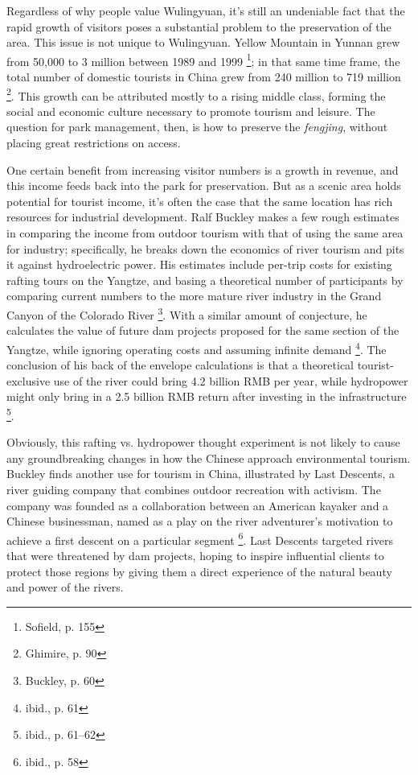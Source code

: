 Regardless of why people value Wulingyuan, it's still an undeniable fact that
the rapid growth of visitors poses a substantial problem to the preservation of
the area. This issue is not unique to Wulingyuan. Yellow Mountain in Yunnan
grew from 50,000 to 3 million between 1989 and 1999 \footnote{Sofield, p. 155};
in that same time frame, the total number of domestic tourists in China grew
from 240 million to 719 million \footnote{Ghimire, p. 90}. This growth can be
attributed mostly to a rising middle class, forming the social and economic
culture necessary to promote tourism and leisure. The question for park
management, then, is how to preserve the \textit{fengjing}, without placing
great restrictions on access.

One certain benefit from increasing visitor numbers is a growth in revenue, and
this income feeds back into the park for preservation. But as a scenic area
holds potential for tourist income, it's often the case that the same location
has rich resources for industrial development. Ralf Buckley makes a few rough
estimates in comparing the income from
outdoor tourism with that of using the same area for industry; specifically, he
breaks down the economics of river tourism and pits it against hydroelectric
power. His estimates include per-trip costs for existing rafting tours on the Yangtze, and
basing a theoretical number of participants by comparing current numbers to the
more mature river industry in the Grand Canyon of the Colorado River
\footnote{Buckley, p. 60}. With a similar amount of conjecture, he calculates the
value of future  dam projects proposed for the same section of the Yangtze,
while ignoring operating costs and assuming infinite demand \footnote{ibid.,
p. 61}. The conclusion of his back of the envelope calculations is that a
theoretical tourist-exclusive use of the river could bring 4.2 billion RMB per
year, while hydropower might only bring in a 2.5 billion RMB return after
investing in the infrastructure \footnote{ibid., p. 61--62}.

Obviously, this rafting vs. hydropower thought experiment is not likely to
cause any groundbreaking changes in how the Chinese approach environmental
tourism. Buckley finds another use for tourism in China, illustrated by Last
Descents, a river guiding company that combines outdoor recreation with
activism. The company was founded as a collaboration between an American
kayaker and a Chinese businessman, named as a play on the river adventurer's
motivation to achieve a first descent on a particular segment \footnote{ibid.,
p. 58}. Last Descents targeted rivers that were threatened by dam projects,
hoping to inspire influential clients to protect those regions by giving them a
direct experience of the natural beauty and power of the rivers.

